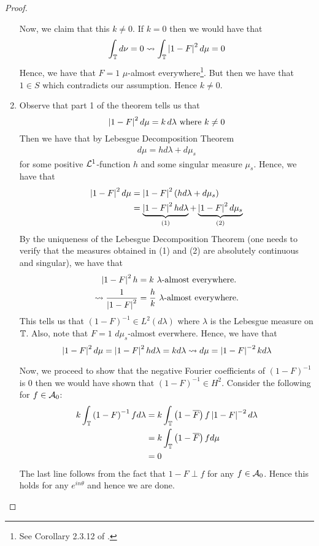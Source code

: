 \begin{proof}
\begin{enumerate}
    Now, we claim that this $k\ne 0$. If $k=0$ then we would have that 
    \begin{equation*}
	\int_{\mathbb T} d\nu = 0 \leadsto \int_{\mathbb T} \left\lvert 1-F \right\rvert^{2} d\mu = 0
    \end{equation*}
    Hence, we have that $F=1$ $\mu$-almost everywhere\footnote{See Corollary 2.3.12 of \cite{cohn2013measure}.}. But then we have that $1\in S$ which contradicts our assumption. Hence $k \ne 0$.
\item Observe that part 1 of the theorem tells us that 
    \begin{equation*}
	\left\lvert 1-F \right\rvert^{2} d\mu = k\, d\lambda \text{ where } k \ne 0
    \end{equation*}
    Then we have that by Lebesgue Decomposition Theorem
    \begin{align*}
	d\mu = h d\lambda + d\mu_{s}
    \end{align*}
    for some positive ${\cal L}^{1}$-function $h$ and some singular measure $\mu_{s}$.
    Hence, we have that
    \begin{align}
	\left\lvert 1-F \right\rvert^{2} d\mu &= \left\lvert 1-F \right\rvert^{2} \left( h d\lambda + d\mu_{s} \right) \\
	&= \underbrace{\left\lvert 1-F \right\rvert^{2} h d\lambda}_{(1)} + \underbrace{\left\lvert 1-F \right\rvert^{2} d\mu_{s}}_{(2)}
	\label{eqn:decomposed-measure}
    \end{align}
    By the uniqueness of the Lebesgue Decomposition Theorem (one needs to verify that the measures obtained in (1) and (2) are absolutely continuous and singular), we have that
\begin{align*}
    \left\lvert 1-F \right\rvert^{2} h &= k \text{ $\lambda$-almost everywhere.} \\
    \leadsto \frac{1}{\left\lvert 1-F \right\rvert^{2}} &= \frac{h}{k} \text{ $\lambda$-almost everywhere.}
\end{align*}
This tells us that $(1-F)^{-1} \in L^{2} \left( d\lambda \right)$ where $\lambda$ is the Lebesgue measure on $\mathbb T$. Also, note that $F=1$ $d\mu_{s}$-almost everwhere. Hence, we have that 
\begin{equation}
    \left\lvert 1-F \right\rvert^{2} d\mu = \left\lvert 1-F \right\rvert^{2} h d\lambda = k d\lambda \leadsto d\mu = \left\lvert 1-F \right\rvert^{-2} k d\lambda
    \label{eqn:prelude-to-f-m}
    \end{equation}

    Now, we proceed to show that the negative Fourier coefficients of $\left( 1-F \right)^{-1}$ is 0 then we would have shown that $\left( 1-F \right)^{-1} \in H^{2}$. Consider the following for $f\in {\cal A}_{0}$:
\begin{align*}
    k \int_{\mathbb T} \left( 1-F \right)^{-1} f d\lambda &= k \int_{\mathbb T} \left( 1-\overline F \right) f \left\lvert 1-F \right\rvert^{-2} d\lambda \\
    &= k \int_{\mathbb T} \left( 1-\overline F \right) f d\mu \\
    &= 0
\end{align*}
The last line follows from the fact that $1-F \perp f$ for any $f\in {\cal A}_{0}$. Hence this holds for any $e^{in\theta}$ and hence we are done.


\end{enumerate}
\end{proof}
